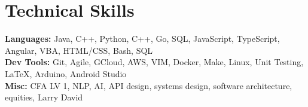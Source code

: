 \documentclass[12pt, letter]{article}
\makeatletter
\newcommand{\resumeItem}[1]{
  \item\small{
    {#1 \vspace{-2pt}}
  }
}
\newcommand{\resumeSubSubheading}[2]{
    \item
    \begin{tabular*}{0.97\textwidth}{l@{\extracolsep{\fill}}r}
      \textit{\small#1} & \textit{\small #2} \\
    \end{tabular*}\vspace{-7pt}
}
\newcommand{\resumeSubHeadingListEnd}{\end{itemize}}
\newcommand{\resumeItemListStart}{\begin{itemize}[noitemsep]} %
\newcommand{\resumeItemListEnd}{\end{itemize}\vspace{-16pt}}
\makeatother
\begin{document}
\vspace{-24pt}




\section{Technical Skills}
{\small
\textbf{Languages:} Java, C++, Python, C++, Go, SQL, JavaScript, TypeScript, Angular, VBA, HTML/CSS, Bash, SQL \\
\textbf{Dev Tools:} Git, Agile, GCloud, AWS, VIM, Docker, Make, Linux, Unit Testing, LaTeX, Arduino, Android Studio \\
\textbf{Misc:} CFA LV 1, NLP, AI, API design, systems design, software architecture, equities, Larry David
}
\end{document}
